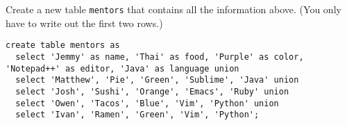 \question Create a new table \lstinline$mentors$ that contains all the information above.
(You only have to write out the first two rows.)

\begin{solution}[3in]
\begin{lstlisting}
create table mentors as
  select 'Jemmy' as name, 'Thai' as food, 'Purple' as color, 'Notepad++' as editor, 'Java' as language union
  select 'Matthew', 'Pie', 'Green', 'Sublime', 'Java' union
  select 'Josh', 'Sushi', 'Orange', 'Emacs', 'Ruby' union
  select 'Owen', 'Tacos', 'Blue', 'Vim', 'Python' union
  select 'Ivan', 'Ramen', 'Green', 'Vim', 'Python';
\end{lstlisting}
\end{solution}
